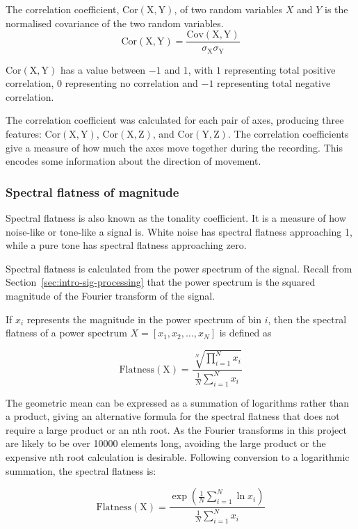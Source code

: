         The correlation coefficient, $\mathrm{Cor(X,Y)}$, of two random variables $X$ and $Y$ is the normalised covariance of the two random variables. $$\mathrm{Cor(X,Y)} = \frac{\mathrm{Cov(X,Y)}}{\sigma_{\mathrm{X}}\sigma_{\mathrm{Y}}}$$
        
        $\mathrm{Cor(X,Y)}$ has a value between $-1$ and $1$, with $1$ representing total positive correlation, $0$ representing no correlation and $-1$ representing total negative correlation.
         
        The correlation coefficient was calculated for each pair of axes, producing three features: $\mathrm{Cor(X,Y)}$, $\mathrm{Cor(X,Z)}$, and $\mathrm{Cor(Y,Z)}$. The correlation coefficients give a measure of how much the axes move together during the recording. This encodes some information about the direction of movement.
      \subsubsection{Spectral flatness of magnitude}
        Spectral flatness is also known as the tonality coefficient. It is a measure of how noise-like or tone-like a signal is. White noise has spectral flatness approaching 1, while a pure tone has spectral flatness approaching zero.
        
        Spectral flatness is calculated from the power spectrum of the signal. Recall from Section~\ref{sec:intro-sig-processing} that the power spectrum is the squared magnitude of the Fourier transform of the signal.
        
        If $x_i$ represents the magnitude in the power spectrum of bin $i$, then the spectral flatness of a power spectrum $X = [x_1, x_2, \dots , x_N]$ is defined as
        
        $$\mathrm{Flatness(X)} = \frac{\sqrt[N]{\prod\limits_{i=1}^N x_i}}{\frac{1}{N}\sum_{i=1}^N x_i}$$
        
        The geometric mean can be expressed as a summation of logarithms rather than a product, giving an alternative formula for the spectral flatness that does not require a large product or an nth root. As the Fourier transforms in this project are likely to be over 10000 elements long, avoiding the large product or the expensive nth root calculation is desirable. Following conversion to a logarithmic summation, the spectral flatness is:
        
        $$\mathrm{Flatness(X)} = \frac{\exp \left( \frac{1}{N}\sum\limits_{i=1}^N \ln x_i \right) }{\frac{1}{N}\sum_{i=1}^N x_i}$$
        
